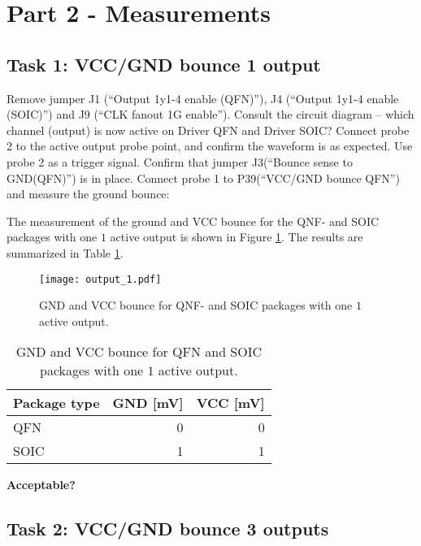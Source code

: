 \documentclass[../main.tex]{subfiles}
\begin{document}
\section{Part 2 - Measurements}

\subsection{Task 1: VCC/GND bounce 1 output}

Remove jumper J1 (“Output 1y1-4 enable (QFN)”), J4 (“Output 1y1-4 enable (SOIC)”) and J9 (“CLK fanout 1G enable”).
\vspace{10pt}
Consult the circuit diagram – which channel (output) is now active on Driver QFN and Driver SOIC? Connect probe 2 to the active output probe point, and confirm the waveform is as expected. Use probe 2 as a trigger signal.
\vspace{10pt}
Confirm that jumper J3(“Bounce sense to GND(QFN)”) is in place. Connect probe 1 to P39(“VCC/GND bounce QFN”) and measure the ground bounce:

\solution

The measurement of the ground and VCC bounce for the QNF- and SOIC packages with one \(\textit{1}\) active output is shown in Figure \ref{fig:gnd_vcc_output_1}. The results are summarized in Table \ref{tab:output_1}.

\begin{figure}[H]
    \centering
    \texttt{[image: output\_1.pdf]}
    \caption{GND and VCC bounce for QNF- and SOIC packages with one \(\textit{1}\) active output.}
    \label{fig:gnd_vcc_output_1}
\end{figure}

\begin{table}[H]
    \centering
    \begin{tabular}{l | r r}
        \toprule[1pt]
        Package type    & GND [mV]  & VCC [mV]\\
        \midrule
        QFN             & 0         & 0  \\
        SOIC            & 1         & 1  \\
        \bottomrule[1pt]
    \end{tabular}
    \caption{GND and VCC bounce for QFN and SOIC packages with one \(\textit{1}\) active output.}
    \label{tab:output_1}
\end{table}

\textbf{Acceptable?}

\subsection{Task 2: VCC/GND bounce 3 outputs}
\end{document}
